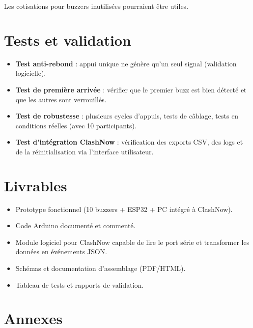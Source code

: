 \documentclass[a4paper,11pt]{article}
\begin{document}
Les cotisations pour buzzers inutilisées pourraient être utiles.

\section{Tests et validation}
\begin{itemize}
  \item \textbf{Test anti-rebond} : appui unique ne génère qu'un seul signal (validation logicielle).
  \item \textbf{Test de première arrivée} : vérifier que le premier buzz est bien détecté et que les autres sont verrouillés.
  \item \textbf{Test de robustesse} : plusieurs cycles d'appuis, tests de câblage, tests en conditions réelles (avec 10 participants).
  \item \textbf{Test d'intégration ClashNow} : vérification des exports CSV, des logs et de la réinitialisation via l’interface utilisateur.
\end{itemize}

\section{Livrables}
\begin{itemize}
  \item Prototype fonctionnel (10 buzzers + ESP32 + PC intégré à ClashNow).
  \item Code Arduino documenté et commenté.
  \item Module logiciel pour ClashNow capable de lire le port série et transformer les données en événements JSON.
  \item Schémas et documentation d'assemblage (PDF/HTML).
  \item Tableau de tests et rapports de validation.
\end{itemize}

\section{Annexes}
\end{document}
